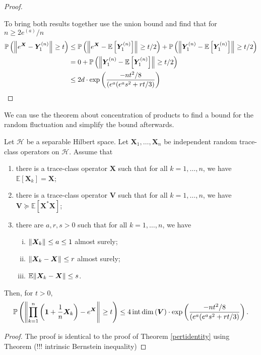 \begin{proof}
\begin{enumerate}[1)]
    \end{enumerate}
   To bring both results together use the union bound and find that for \( n \geq 2e^{(a)}/n \)
   \begin{align*}
     \mathbb{P}\left(\norm{e^{\bm{X}}-\bm{Y}_1^{(n)}}_{} \geq t \right) &\leq \mathbb{P}\left(\norm{e^{\bm{X}}-\mathbb{E}\left[\bm{Y}_1^{(n)}\right]}_{} \geq t/2 \right)  + \mathbb{P}\left(\norm{\bm{Y}_1^{(n)}-\mathbb{E}\left[\bm{Y}_1^{(n)}\right]}_{} \geq t/2 \right) \\
                                                                        &= 0 + \mathbb{P}\left(\norm{\bm{Y}_1^{(n)}-\mathbb{E}\left[\bm{Y}_1^{(n)}\right]}_{} \geq t/2 \right) \\
                                                                        & \leq 2d \cdot \operatorname{exp}\left(\frac{-nt^2/8}{(e^{a}(e^a s^2+rt/3)}\right) 
   \end{align*}
   


\end{proof}
We can use the theorem about concentration of products to find a bound for the random fluctuation and simplify the bound afterwards.

\begin{corl}
    Let \( \mathcal{H} \) be a separable Hilbert space. Let \( \bm{X}_1, \dots, \bm{X}_n \) be independent random trace-class operators on \( \mathcal{H} \). Assume that 
    \begin{enumerate}[1)]
      \item there is a trace-class operator \( \bm{X} \) such that for all \( k=1, \dots, n \), we have \(\mathbb{E}\left[\bm{X}_k\right]=\bm{X}\);
      \item there is a trace-class operator \( \bm{V} \) such that for all \( k=1, \dots, n \), we have \( \bm{V} \succeq \mathbb{E}\left[\bm{X}^{*}\bm{X}\right] \);
      \item there are \( a,r,s >0 \) such that for all \( k=1,\dots, n \), we have 
        \begin{enumerate}[i)]
          \item \( \norm{\bm{X}_k}_{} \leq a \leq 1 \) almost surely;
          \item \( \norm{\bm{X}_k-\bm{X}}_{} \leq r\) almost surely;
          \item \( \mathbb{E}\norm{\bm{X}_k-\bm{X}} \leq s \).
        \end{enumerate}
    \end{enumerate} 
    Then, for \( t >0  \), 
  \[\mathbb{P}\left(\norm{\prod_{k=1}^{n}\left(\bm{1}+\frac{1}{n}\bm{X}_k\right)-e^{\bm{X}}}_{} \geq t \right) \leq 4 \operatorname{int\, dim}\left(\bm{V}\right) \cdot \operatorname{exp}\left(\frac{-nt^2/8}{(e^{a}(e^a s^2+rt/3)}\right) .\]
\end{corl}
\begin{proof}
  The proof is identical to the proof of Theorem \ref{pertidentity} using Theorem (!!! intrinsic Bernstein inequality)
\end{proof}




